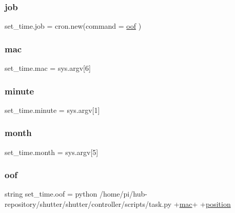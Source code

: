 \mbox{\label{namespaceset__time_a426ad1636cada91a1e8d7afad962d791}} 
\subsubsection{\texorpdfstring{job}{job}}
{\footnotesize\ttfamily set\+\_\+time.\+job = cron.\+new(command = \hyperlink{namespaceset__time_af2ed09847fd976695336fbf8bbfcfd56}{oof} )}

\mbox{\label{namespaceset__time_a7d323bbf3d79eac87d5851d0b1389561}} 
\subsubsection{\texorpdfstring{mac}{mac}}
{\footnotesize\ttfamily set\+\_\+time.\+mac = sys.\+argv\mbox{[}6\mbox{]}}

\mbox{\label{namespaceset__time_aac07b96e110bddcafecbb0249a2b1b22}} 
\subsubsection{\texorpdfstring{minute}{minute}}
{\footnotesize\ttfamily set\+\_\+time.\+minute = sys.\+argv\mbox{[}1\mbox{]}}

\mbox{\label{namespaceset__time_a1985921767360034acf361d528c1ed40}} 
\subsubsection{\texorpdfstring{month}{month}}
{\footnotesize\ttfamily set\+\_\+time.\+month = sys.\+argv\mbox{[}5\mbox{]}}

\mbox{\label{namespaceset__time_af2ed09847fd976695336fbf8bbfcfd56}} 
\subsubsection{\texorpdfstring{oof}{oof}}
{\footnotesize\ttfamily string set\+\_\+time.\+oof = \textquotesingle{}python /home/pi/hub-\/repository/shutter/shutter/controller/scripts/task.\+py \textquotesingle{}+\hyperlink{namespaceset__time_a7d323bbf3d79eac87d5851d0b1389561}{mac}+\textquotesingle{} \textquotesingle{}+\hyperlink{namespaceset__time_a0c50bf42014a5648a86abdcee8bf1069}{position}}

